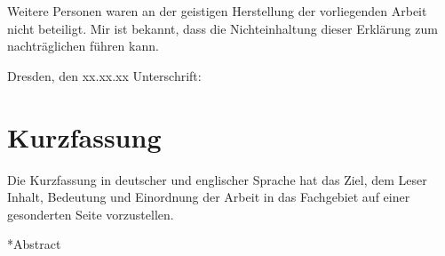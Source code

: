 \documentclass[%
  paper=a4,
  fontsize=12pt,
  twoside=false,
  headsepline=true,
  numbers=noenddot]{scrartcl}
\begin{document}
\noindent Weitere Personen waren an der geistigen Herstellung der vorliegenden Arbeit nicht beteiligt.
Mir ist bekannt, dass die Nichteinhaltung dieser Erklärung  zum nachträglichen
 führen kann.

\vspace*{2cm}
\noindent Dresden, den xx.xx.xx \hspace{3cm} Unterschrift: \\

\cleardoublepage


\section*{Kurzfassung}

Die Kurzfassung in deutscher und englischer Sprache hat das Ziel, dem Leser Inhalt, Bedeutung und Einordnung der Arbeit in das Fachgebiet auf einer gesonderten Seite vorzustellen.

\vspace*{2cm}

\makeatletter
{} %
\makeatother

\cleardoublepage



\tableofcontents



\listoffigures



\listoftables

\end{document}
